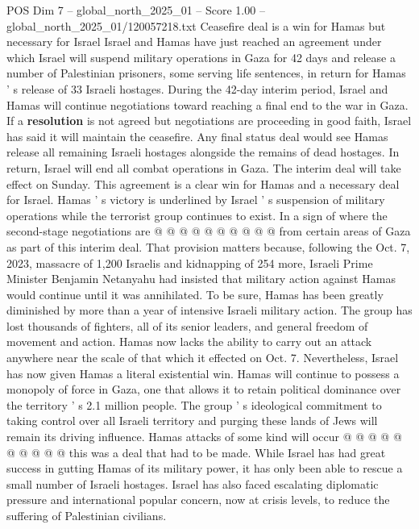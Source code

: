 \begin{textsample}{POS Dim 7 – global\_north\_2025\_01 – Score 1.00 – global\_north\_2025\_01/120057218.txt}  \label{ex:f7_pos_398}
Ceasefire deal is a win for Hamas but necessary for Israel Israel and Hamas have just reached an agreement under which Israel will suspend military operations in Gaza for 42 days and release a number of Palestinian prisoners, some serving life sentences, in return for Hamas ' s release of 33 Israeli hostages.
During the 42-day interim period, Israel and Hamas will continue negotiations toward reaching a final end to the war in Gaza.
If a \textbf{resolution} is not agreed but negotiations are proceeding in good faith, Israel has said it will maintain the ceasefire.
Any final status deal would see Hamas release all remaining Israeli hostages alongside the remains of dead hostages.
In return, Israel will end all combat operations in Gaza.
The interim deal will take effect on Sunday.
This agreement is a clear win for Hamas and a necessary deal for Israel.
Hamas ' s victory is underlined by Israel ' s suspension of military operations while the terrorist group continues to exist.
In a sign of where the second-stage negotiations are @ @ @ @ @ @ @ @ @ @ from certain areas of Gaza as part of this interim deal.
That provision matters because, following the Oct. 7, 2023, massacre of 1,200 Israelis and kidnapping of 254 more, Israeli Prime Minister Benjamin Netanyahu had insisted that military action against Hamas would continue until it was annihilated.
To be sure, Hamas has been greatly diminished by more than a year of intensive Israeli military action.
The group has lost thousands of fighters, all of its senior leaders, and general freedom of movement and action.
Hamas now lacks the ability to carry out an attack anywhere near the scale of that which it effected on Oct. 7.
Nevertheless, Israel has now given Hamas a literal existential win.
Hamas will continue to possess a monopoly of force in Gaza, one that allows it to retain political dominance over the territory ' s 2.1 million people.
The group ' s ideological commitment to taking control over all Israeli territory and purging these lands of Jews will remain its driving influence.
Hamas attacks of some kind will occur @ @ @ @ @ @ @ @ @ @ this was a deal that had to be made.
While Israel has had great success in gutting Hamas of its military power, it has only been able to rescue a small number of Israeli hostages.
Israel has also faced escalating diplomatic pressure and international popular concern, now at crisis levels, to reduce the suffering of Palestinian civilians.

\end{textsample}
